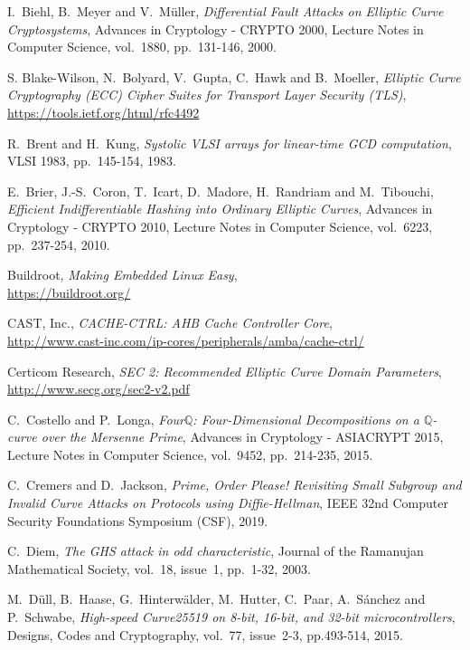 \documentclass{llncs}
\begin{document}
\begin{thebibliography}{20}
I.~Biehl, B.~Meyer and V.~Müller,
\emph{Differential Fault Attacks on Elliptic Curve Cryptosystems},
Advances in Cryptology - CRYPTO 2000, Lecture Notes in Computer Science,
vol.~1880, pp.~131-146, 2000.

S. Blake-Wilson, N.~Bolyard, V.~Gupta, C.~Hawk and B.~Moeller,
\emph{Elliptic Curve Cryptography (ECC) Cipher Suites for Transport
Layer Security (TLS)},\\
\url{https://tools.ietf.org/html/rfc4492}

R.~Brent and H.~Kung,
\emph{Systolic VLSI arrays for linear-time GCD computation},
VLSI 1983, pp.~145-154, 1983.

E.~Brier, J.-S.~Coron, T.~Icart, D.~Madore, H.~Randriam and M.~Tibouchi,
\emph{Efficient Indifferentiable Hashing into Ordinary Elliptic Curves},
Advances in Cryptology - CRYPTO 2010, Lecture Notes in Computer Science,
vol.~6223, pp.~237-254, 2010.

Buildroot,
\emph{Making Embedded Linux Easy},\\
\url{https://buildroot.org/}

CAST, Inc.,
\emph{CACHE-CTRL: AHB Cache Controller Core},\\
\url{http://www.cast-inc.com/ip-cores/peripherals/amba/cache-ctrl/}

Certicom Research,
\emph{SEC 2: Recommended Elliptic Curve Domain Parameters},\\
\url{http://www.secg.org/sec2-v2.pdf}

C.~Costello and P.~Longa,
\emph{Four$\mathbb{Q}$: Four-Dimensional Decompositions on a
$\mathbb{Q}$-curve over the Mersenne Prime},
Advances in Cryptology - ASIACRYPT 2015, Lecture Notes in Computer
Science, vol.~9452, pp.~214-235, 2015.

C.~Cremers and D.~Jackson,
\emph{Prime, Order Please! Revisiting Small Subgroup and Invalid Curve
Attacks on Protocols using Diffie-Hellman},
IEEE 32nd Computer Security Foundations Symposium (CSF), 2019.

C.~Diem,
\emph{The GHS attack in odd characteristic},
Journal of the Ramanujan Mathematical Society, vol.~18, issue~1,
pp.~1-32, 2003.

M.~Düll, B.~Haase, G.~Hinterwälder, M.~Hutter, C.~Paar, A.~Sánchez
and P.~Schwabe,
\emph{High-speed Curve25519 on 8-bit, 16-bit, and 32-bit microcontrollers},
Designs, Codes and Cryptography, vol.~77, issue~2-3, pp.493-514, 2015.


\end{thebibliography}
\end{document}
